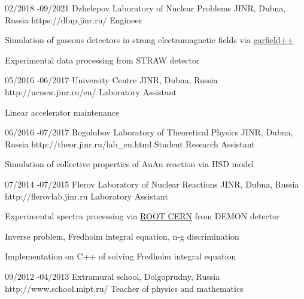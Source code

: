 \documentclass[10pt]{article} %
\begin{document}
\job
{02/2018 -}{09/2021	}
{Dzhelepov Laboratory of Nuclear Problems JINR, Dubna, Russia}
{https://dlnp.jinr.ru/}
{Engineer}
{
\begin{itemize-noindent}
\item{Simulation of gaseous detectors in strong electromagnetic fields via \href{https://garfieldpp.web.cern.ch/garfieldpp/}{garfield++}}
\item{Experimental data processing from STRAW detector}
\end{itemize-noindent}
}

\job
{05/2016 -}{06/2017}
{University Centre JINR, Dubna, Russia}
{http://ucnew.jinr.ru/en/}
{Laboratory Assistant}
{
\begin{itemize-noindent}
\item{Linear accelerator maintenance}
\end{itemize-noindent}
}

\job
{06/2016 -}{07/2017}
{Bogolubov Laboratory of Theoretical Physics JINR, Dubna, Russia}
{http://theor.jinr.ru/lab_en.html}
{Student Research Assistant}
{
\begin{itemize-noindent}
\item{Simulation of collective properties of AuAu reaction via HSD model}
\end{itemize-noindent}
}

\job
{07/2014 -}{07/2015}
{Flerov Laboratory of Nuclear Reactions JINR, Dubna, Russia}
{http://flerovlab.jinr.ru}
{Laboratory Assistant}
{
\begin{itemize-noindent}
\item{Experimental spectra processing via \href{https://root.cern/}{ROOT CERN} from DEMON detector}
\item{Inverse problem, Fredholm integral equation, n-g discrimination}
\item{Implementation on C++ of solving Fredholm integral equation}
\end{itemize-noindent}
}

\job
{09/2012 -}{04/2013}
{Extramural school, Dolgoprudny, Russia}
{http://www.school.mipt.ru/}
{Teacher of physics and mathematics}

\end{document}
